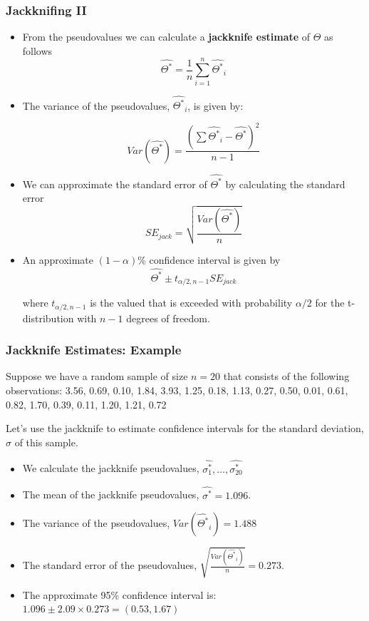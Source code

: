 \documentclass{beamer}
\begin{document}
\begin{frame}
  \frametitle{Jackknifing II}

\begin{itemize}
    \item From the pseudovalues we can calculate a \textbf{jackknife estimate} of $\Theta$ as follows
\[
\widehat{\Theta^*} = \frac{1}{n} \sum_{i=1}^{n}\widehat{\Theta^*}_i
\]

  \item The variance of the pseudovalues, $\widehat{\Theta^*}_i$, is given by:

\[
Var(\widehat{\Theta^*}) = \frac{(\sum \widehat{\Theta^*}_i - \widehat{\Theta^*})^2}{n-1}
\]


    \item We can approximate the standard error of $\widehat{\Theta^*}$ by calculating the standard error
\[
SE_{jack} = \sqrt{\frac{Var(\widehat{\Theta^*})}{n}}
\]


    \item An approximate $(1-\alpha)$\% confidence interval is given by
\[
\widehat{\Theta^*} \pm t_{\alpha/2, n-1} SE_{jack}
\]

where $t_{\alpha/2, n-1}$ is the valued that is exceeded with probability $\alpha/2$ for the t-distribution with $n-1$ degrees of freedom.

\end{itemize}

\end{frame}

\begin{frame}
  \frametitle{Jackknife Estimates: Example}

Suppose we have a random sample of size $n=20$ that consists of the following observations: 3.56, 0.69, 0.10, 1.84, 3.93, 1.25, 0.18, 1.13, 0.27, 0.50, 0.01, 0.61, 0.82, 1.70, 0.39, 0.11, 1.20, 1.21, 0.72
\medskip

Let's use the jackknife to estimate confidence intervals for the standard deviation, $\sigma$ of this sample.

\begin{itemize}
    \item We calculate the jackknife pseudovalues, $\widehat{\sigma^*_1}, \ldots, \widehat{\sigma^*_{20}}$
    \item The mean of the jackknife pseudovalues, $\widehat{\sigma^*} = 1.096$.
    \item The variance of the pseudovalues, $Var(\widehat{\Theta^*}_i) = 1.488$
    \item The standard error of the pseudovalues, $\sqrt{\frac{Var(\widehat{\Theta^*}_i)}{n}} = 0.273$.
    \item The approximate 95\% confidence interval is: $1.096 \pm 2.09 \times 0.273 = (0.53, 1.67)$

\end{itemize}



\end{frame}
\end{document}

